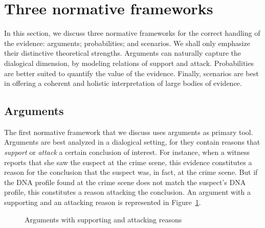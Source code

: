 \documentclass[10pt]{article}
\begin{document}
\section{Three normative frameworks}
\label{sec:frameworks}

In this section, we discuss three normative frameworks for the correct handling of the evidence: 
arguments; probabilities; and scenarios. %
We shall only emphasize their distinctive theoretical strengths. Arguments can naturally 
capture the dialogical dimension, by modeling relations of support and attack. 
Probabilities are better suited to quantify the value of the evidence. Finally, scenarios are 
best in offering a coherent and holistic interpretation 
of large bodies of evidence. 


\subsection{Arguments}

The first normative framework %
that we discuss uses arguments as primary tool. 
Arguments are best analyzed in a dialogical setting, for they 
contain reasons that \textit{support} or \textit{attack} a certain conclusion of interest. For instance, when a witness reports that 
she saw the suspect at the crime scene, this evidence constitutes a reason for the conclusion that 
the suspect was, in fact, at the crime scene. But if the DNA profile found at the crime scene 
does not match the suspect's DNA profile, this constitutes 
a reason attacking the conclusion. An argument with a supporting and 
an attacking reason is represented in Figure~\ref{fig:arg}.

\begin{figure}[bt]
\centering

\caption{Arguments with supporting and attacking reasons\label{fig:arg}}
\end{figure}

\end{document}
